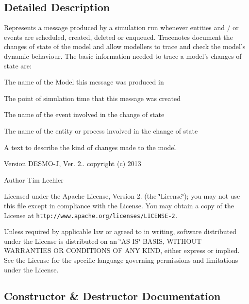 \subsection{Detailed Description}
Represents a message produced by a simulation run whenever entities and / or events are scheduled, created, deleted or enqueued. Tracenotes document the changes of state of the model and allow modellers to trace and check the model's dynamic behaviour. The basic information needed to trace a model's changes of state are\-: 
\begin{DoxyItemize}
\item The name of the Model this message was produced in 
\item The point of simulation time that this message was created 
\item The name of the event involved in the change of state 
\item The name of the entity or process involved in the change of state 
\item A text to describe the kind of changes made to the model 
\end{DoxyItemize}

\begin{DoxyVersion}{Version}
D\-E\-S\-M\-O-\/\-J, Ver. 2.. copyright (c) 2013 
\end{DoxyVersion}
\begin{DoxyAuthor}{Author}
Tim Lechler
\end{DoxyAuthor}
Licensed under the Apache License, Version 2. (the \char`\"{}\-License\char`\"{}); you may not use this file except in compliance with the License. You may obtain a copy of the License at {\tt http\-://www.\-apache.\-org/licenses/\-L\-I\-C\-E\-N\-S\-E-\/2.}

Unless required by applicable law or agreed to in writing, software distributed under the License is distributed on an \char`\"{}\-A\-S I\-S\char`\"{} B\-A\-S\-I\-S, W\-I\-T\-H\-O\-U\-T W\-A\-R\-R\-A\-N\-T\-I\-E\-S O\-R C\-O\-N\-D\-I\-T\-I\-O\-N\-S O\-F A\-N\-Y K\-I\-N\-D, either express or implied. See the License for the specific language governing permissions and limitations under the License. 

\subsection{Constructor \& Destructor Documentation}
